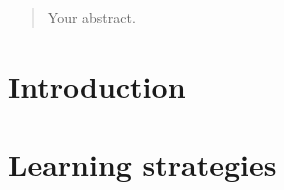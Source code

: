\documentclass[12pt,twoside]{report}
\date{September 2017}
\begin{document}



\clearpage{\pagestyle{empty}\cleardoublepage}
\setcounter{page}{1}

\begin{abstract}
Your abstract.
\end{abstract}

\cleardoublepage

\clearpage{\pagestyle{empty}\cleardoublepage}

\tableofcontents 


\clearpage{\pagestyle{empty}\cleardoublepage}
\setcounter{page}{1}






\chapter{Introduction}











\chapter{Learning strategies}
\end{document}
